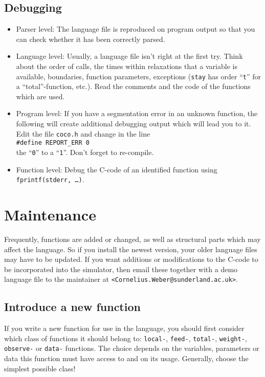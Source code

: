\documentclass[12pt]{article}
\begin{document}
\subsection{Debugging}

 \begin{itemize}
 \item Parser level:
 The language file is reproduced on program output so that you can check whether it has been correctly parsed.

 \item Language level:
 Usually, a language file isn't right at the first try.
 Think about the order of calls, the times within relaxations that a variable is available, boundaries,
 function parameters, exceptions (\texttt{stay} has order ``\texttt{t}'' for a ``total''-function, etc.).
 Read the comments and the code of the functions which are used.

 \item Program level:
 If you have a segmentation error in an unknown function,
 the following will create additional debugging output which will lead you to it.
 Edit the file \texttt{coco.h} and change in the line \\
 \hspace*{11mm} \texttt{\#define REPORT\_ERR 0} \\
 the ``\texttt{0}'' to a ``\texttt{1}''. Don't forget to re-compile.

 \item Function level:
 Debug the C-code of an identified function using \\
 \texttt{fprintf(stderr, \ldots)}.
 \end{itemize}

\section{Maintenance}

 Frequently, functions are added or changed, as well as structural parts which may affect the language.
 So if you install the newest version, your older language files may have to be updated.
 If you want additions or modifications to the C-code to be incorporated into the simulator,
 then email these together with a demo language file to the maintainer at \texttt{<Cornelius.Weber@sunderland.ac.uk>}.

\subsection{Introduce a new function}
 If you write a new function for use in the language,
 you should first consider which class of functions it should belong to:
 \texttt{local-}, \texttt{feed-}, \texttt{total-}, \texttt{weight-}, \texttt{observe-} or \texttt{data-} functions.
 The choice depends on the variables, parameters or data this function must have access to and on its usage.
 Generally, choose the simplest possible class!
\end{document}
